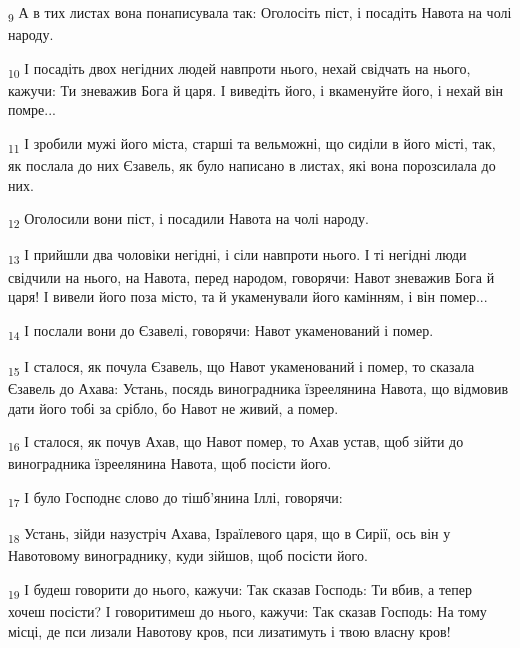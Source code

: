 \begin{tcolorbox}
\textsubscript{9} А в тих листах вона понаписувала так: Оголосіть піст, і посадіть Навота на чолі народу.
\end{tcolorbox}
\begin{tcolorbox}
\textsubscript{10} І посадіть двох негідних людей навпроти нього, нехай свідчать на нього, кажучи: Ти зневажив Бога й царя. І виведіть його, і вкаменуйте його, і нехай він помре...
\end{tcolorbox}
\begin{tcolorbox}
\textsubscript{11} І зробили мужі його міста, старші та вельможні, що сиділи в його місті, так, як послала до них Єзавель, як було написано в листах, які вона порозсилала до них.
\end{tcolorbox}
\begin{tcolorbox}
\textsubscript{12} Оголосили вони піст, і посадили Навота на чолі народу.
\end{tcolorbox}
\begin{tcolorbox}
\textsubscript{13} І прийшли два чоловіки негідні, і сіли навпроти нього. І ті негідні люди свідчили на нього, на Навота, перед народом, говорячи: Навот зневажив Бога й царя! І вивели його поза місто, та й укаменували його камінням, і він помер...
\end{tcolorbox}
\begin{tcolorbox}
\textsubscript{14} І послали вони до Єзавелі, говорячи: Навот укаменований і помер.
\end{tcolorbox}
\begin{tcolorbox}
\textsubscript{15} І сталося, як почула Єзавель, що Навот укаменований і помер, то сказала Єзавель до Ахава: Устань, посядь виноградника їзреелянина Навота, що відмовив дати його тобі за срібло, бо Навот не живий, а помер.
\end{tcolorbox}
\begin{tcolorbox}
\textsubscript{16} І сталося, як почув Ахав, що Навот помер, то Ахав устав, щоб зійти до виноградника їзреелянина Навота, щоб посісти його.
\end{tcolorbox}
\begin{tcolorbox}
\textsubscript{17} І було Господнє слово до тішб'янина Іллі, говорячи:
\end{tcolorbox}
\begin{tcolorbox}
\textsubscript{18} Устань, зійди назустріч Ахава, Ізраїлевого царя, що в Сирії, ось він у Навотовому винограднику, куди зійшов, щоб посісти його.
\end{tcolorbox}
\begin{tcolorbox}
\textsubscript{19} І будеш говорити до нього, кажучи: Так сказав Господь: Ти вбив, а тепер хочеш посісти? І говоритимеш до нього, кажучи: Так сказав Господь: На тому місці, де пси лизали Навотову кров, пси лизатимуть і твою власну кров!
\end{tcolorbox}
